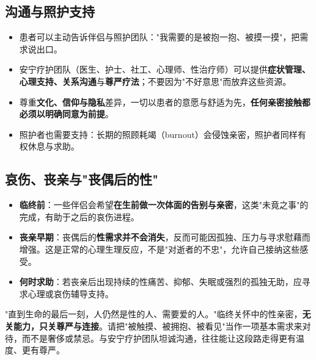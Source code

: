 \subsection{沟通与照护支持}

\begin{itemize}
	\item 患者可以主动告诉伴侣与照护团队："我需要的是被抱一抱、被摸一摸"，把需求说出口。
	\item 安宁疗护团队（医生、护士、社工、心理师、性治疗师）可以提供\textbf{症状管理、心理支持、关系沟通}与\textbf{尊严疗法}；不要因为"不好意思"而放弃这些资源。
	\item 尊重\textbf{文化、信仰与隐私}差异，一切以患者的意愿与舒适为先，\textbf{任何亲密接触都必须以明确同意为前提}。
	\item 照护者也需要支持：长期的照顾耗竭（burnout）会侵蚀亲密，照护者同样有权休息与求助。
\end{itemize}

\subsection{哀伤、丧亲与"丧偶后的性"}

\begin{itemize}
	\item \textbf{临终前}：一些伴侣会希望\textbf{在生前做一次体面的告别与亲密}，这类"未竟之事"的完成，有助于之后的哀伤进程。
	\item \textbf{丧亲早期}：丧偶后的\textbf{性需求并不会消失}，反而可能因孤独、压力与寻求慰藉而增强。这是正常的心理生理反应，不是"对逝者的不忠"，允许自己接纳这些感受。
	\item \textbf{何时求助}：若丧亲后出现持续的性痛苦、抑郁、失眠或强烈的孤独无助，应寻求心理或哀伤辅导支持。
\end{itemize}

\begin{tcolorbox}[colback=purple!5!white,colframe=purple!55!black,title=贴心小叮咛]
"直到生命的最后一刻，人仍然是性的人、需要爱的人。"临终关怀中的性亲密，\textbf{无关能力，只关尊严与连接}。请把"被触摸、被拥抱、被看见"当作一项基本需求来对待，而不是奢侈或禁忌。与安宁疗护团队坦诚沟通，往往能让这段路走得更有温度、更有尊严。
\end{tcolorbox}

